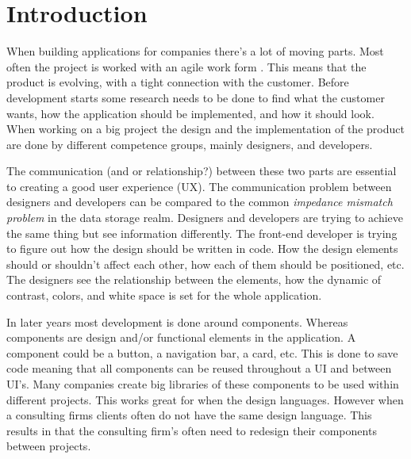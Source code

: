 \section{Introduction}




When building applications for companies there's a lot of moving parts. Most often the project is worked with an agile work form \cite{cohen2004introduction}. This means that the product is evolving, with a tight connection with the customer. Before development starts some research needs to be done to find what the customer wants, how the application should be implemented, and how it should look. When working on a big project the design and the implementation of the product are done by different competence groups, mainly designers, and developers. 

The communication (and or relationship?) between these two parts are essential to creating a good user experience (UX). The communication problem between designers and developers can be compared to the common \textit{impedance mismatch problem} in the data storage realm. Designers and developers are trying to achieve the same thing but see information differently. The front-end developer is trying to figure out how the design should be written in code. How the design elements should or shouldn't affect each other, how each of them should be positioned, etc. The designers see the relationship between the elements, how the dynamic of contrast, colors, and white space is set for the whole application. 

In later years most development is done around components. Whereas components are design and/or functional elements in the application. A component could be a button, a navigation bar, a card\cite{babichSimpleDesignTips2020}, etc. This is done to save code meaning that all components can be reused throughout a UI and between UI's. Many companies create big libraries of these components to be used within different projects. This works great for when the design languages. However when a consulting firms clients often do not have the same design language. This results in that the consulting firm's often need to redesign their components between projects. 



